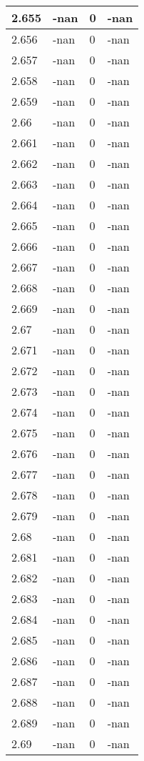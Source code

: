 \documentclass[a4paper,14pt]{extarticle}
\begin{document}
\begin{longtable}{||m{3cm}||m{3cm}|m{3cm}||m{3cm}||}
\hline
2.655 & -nan & 0 & -nan\\
\hline
2.656 & -nan & 0 & -nan\\
\hline
2.657 & -nan & 0 & -nan\\
\hline
2.658 & -nan & 0 & -nan\\
\hline
2.659 & -nan & 0 & -nan\\
\hline
2.66 & -nan & 0 & -nan\\
\hline
2.661 & -nan & 0 & -nan\\
\hline
2.662 & -nan & 0 & -nan\\
\hline
2.663 & -nan & 0 & -nan\\
\hline
2.664 & -nan & 0 & -nan\\
\hline
2.665 & -nan & 0 & -nan\\
\hline
2.666 & -nan & 0 & -nan\\
\hline
2.667 & -nan & 0 & -nan\\
\hline
2.668 & -nan & 0 & -nan\\
\hline
2.669 & -nan & 0 & -nan\\
\hline
2.67 & -nan & 0 & -nan\\
\hline
2.671 & -nan & 0 & -nan\\
\hline
2.672 & -nan & 0 & -nan\\
\hline
2.673 & -nan & 0 & -nan\\
\hline
2.674 & -nan & 0 & -nan\\
\hline
2.675 & -nan & 0 & -nan\\
\hline
2.676 & -nan & 0 & -nan\\
\hline
2.677 & -nan & 0 & -nan\\
\hline
2.678 & -nan & 0 & -nan\\
\hline
2.679 & -nan & 0 & -nan\\
\hline
2.68 & -nan & 0 & -nan\\
\hline
2.681 & -nan & 0 & -nan\\
\hline
2.682 & -nan & 0 & -nan\\
\hline
2.683 & -nan & 0 & -nan\\
\hline
2.684 & -nan & 0 & -nan\\
\hline
2.685 & -nan & 0 & -nan\\
\hline
2.686 & -nan & 0 & -nan\\
\hline
2.687 & -nan & 0 & -nan\\
\hline
2.688 & -nan & 0 & -nan\\
\hline
2.689 & -nan & 0 & -nan\\
\hline
2.69 & -nan & 0 & -nan\\

\end{longtable}
\end{document}
